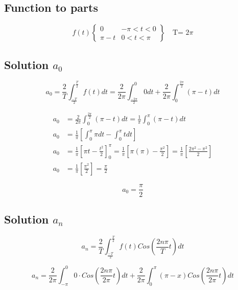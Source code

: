 \documentclass{article}
\begin{document}
\subsection{Function to parts}
\begin{equation}
    f(t)\begin{Bmatrix}
0 & -\pi< t < 0\\ 
\pi -t & 0 < t <\pi 
\end{Bmatrix}
\quad \text{T= 2$\pi$}
\end{equation}

\subsection{Solution $a_0$}

\begin{equation}
    a_0=\frac{2}{T} \int_{\frac{-T}{2}}^{\frac{T}{2}}f(t)dt = \frac{2}{2 \pi} \int_{\frac{-2 \pi}{2}}^{0}0dt+ \frac{2}{2 \pi} \int_{0}^{\frac{2 \pi}{2}}(\pi - t)dt
\end{equation}

\begin{align*}
    a_0&=\frac{2}{2 \pi} \int_{0}^{\frac{2 \pi}{2}}(\pi - t)dt= \frac{1}{ \pi} \int_{0}^{\pi}(\pi - t)dt\\
    a_0&= \frac{1}{ \pi} \left [\int_{0}^{\pi}\pi dt -  \int_{0}^{\pi}t dt \right ]\\
    a_0&= \frac{1}{ \pi} \left [ \pi t -  \frac{t^2}{2} \right ]_{0}^{\pi}=\frac{1}{ \pi} \left [ \pi (\pi) -  \frac{\pi ^2}{2} \right ]= \frac{1}{ \pi} \left [  \frac{2 \pi^2 -\pi^2}{2} \right ]\\
    a_0&=\frac{1}{ \pi} \left [  \frac{\pi^2}{2} \right ]=\frac{\pi}{2}
\end{align*}

\begin{equation}
\boxed{ a_0=\frac{\pi}{2}}
\end{equation}
\subsection{Solution $a_n$}

\begin{equation}
    a_n=\frac{2}{T} \int_{\frac{-T}{2}}^{\frac{T}{2}}f(t)Cos \left ( \frac{2 n \pi}{T}t\right )dt
\end{equation}

\begin{equation}
    a_n=\frac{2}{2 \pi} \int_{- \pi}^{0}0 \cdot Cos \left ( \frac{2 n \pi}{2 \pi}t\right )dt+\frac{2}{2 \pi} \int_{0}^{\pi}(\pi -x) Cos \left ( \frac{2 n \pi}{2 \pi}t\right )dt
\end{equation}
\end{document}
